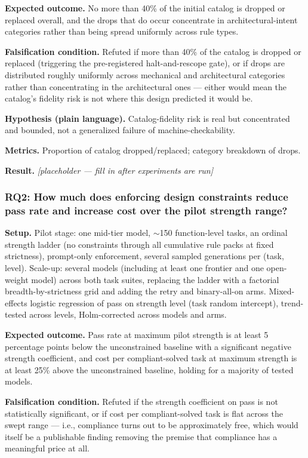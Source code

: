 \documentclass[11pt]{article}
\newcommand{\ph}{\textit{[placeholder --- fill in after experiments are run]}}
\begin{document}
\textbf{Expected outcome.} No more than 40\% of the initial catalog is dropped or replaced overall, and the drops that do occur concentrate in architectural-intent categories rather than being spread uniformly across rule types.

\textbf{Falsification condition.} Refuted if more than 40\% of the catalog is dropped or replaced (triggering the pre-registered halt-and-rescope gate), or if drops are distributed roughly uniformly across mechanical and architectural categories rather than concentrating in the architectural ones --- either would mean the catalog's fidelity risk is not where this design predicted it would be.

\textbf{Hypothesis (plain language).} Catalog-fidelity risk is real but concentrated and bounded, not a generalized failure of machine-checkability.

\textbf{Metrics.} Proportion of catalog dropped/replaced; category breakdown of drops.

\textbf{Result.} \ph

\subsubsection{RQ2: How much does enforcing design constraints reduce pass rate and increase cost over the pilot strength range?}
\textbf{Setup.} Pilot stage: one mid-tier model, $\sim$150 function-level tasks, an ordinal strength ladder (no constraints through all cumulative rule packs at fixed strictness), prompt-only enforcement, several sampled generations per (task, level). Scale-up: several models (including at least one frontier and one open-weight model) across both task suites, replacing the ladder with a factorial breadth-by-strictness grid and adding the retry and binary-all-on arms. Mixed-effects logistic regression of pass on strength level (task random intercept), trend-tested across levels, Holm-corrected across models and arms.

\textbf{Expected outcome.} Pass rate at maximum pilot strength is at least 5 percentage points below the unconstrained baseline with a significant negative strength coefficient, and cost per compliant-solved task at maximum strength is at least 25\% above the unconstrained baseline, holding for a majority of tested models.

\textbf{Falsification condition.} Refuted if the strength coefficient on pass is not statistically significant, or if cost per compliant-solved task is flat across the swept range --- i.e., compliance turns out to be approximately free, which would itself be a publishable finding removing the premise that compliance has a meaningful price at all.
\end{document}
